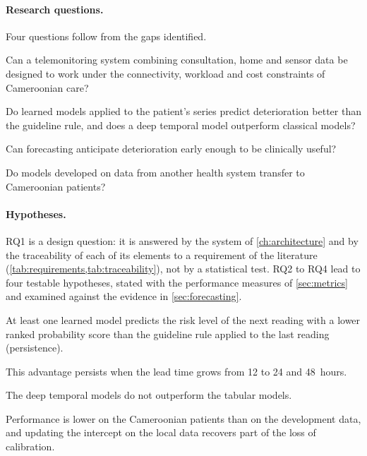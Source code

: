 \paragraph{Research questions.} Four questions follow from the gaps identified.
\begin{description}[nosep]
  \item[RQ1.] Can a telemonitoring system combining consultation, home and sensor data be designed to work under the connectivity, workload and cost constraints of Cameroonian care?
  \item[RQ2.] Do learned models applied to the patient's series predict deterioration better than the guideline rule, and does a deep temporal model outperform classical models?
  \item[RQ3.] Can forecasting anticipate deterioration early enough to be clinically useful?
  \item[RQ4.] Do models developed on data from another health system transfer to Cameroonian patients?
\end{description}

\paragraph{Hypotheses.} RQ1 is a design question: it is answered by the system of \cref{ch:architecture} and by the traceability of each of its elements to a requirement of the literature (\cref{tab:requirements,tab:traceability}), not by a statistical test. RQ2 to RQ4 lead to four testable hypotheses, stated with the performance measures of \cref{sec:metrics} and examined against the evidence in \cref{sec:forecasting}.
\begin{description}[nosep]
  \item[H1.] At least one learned model predicts the risk level of the next reading with a lower ranked probability score than the guideline rule applied to the last reading (persistence).
  \item[H2.] This advantage persists when the lead time grows from 12 to 24 and 48~hours.
  \item[H3.] The deep temporal models do not outperform the tabular models.
  \item[H4.] Performance is lower on the Cameroonian patients than on the development data, and updating the intercept on the local data recovers part of the loss of calibration.
\end{description}

